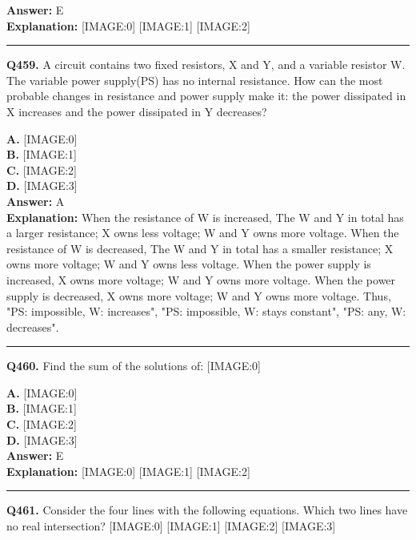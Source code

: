 \documentclass[12pt]{article}
\begin{document}
\textbf{Answer:} E \\
\textbf{Explanation:} [IMAGE:0]
[IMAGE:1]
[IMAGE:2]

\hrule
\vspace{1em}


\noindent
\textbf{Q459.} A circuit contains two fixed resistors, X and Y, and a variable resistor W. The variable power supply(PS) has no internal resistance.
How can the most probable changes in resistance and power supply make it: the power dissipated in X increases and the power dissipated in Y decreases?



\textbf{A.} [IMAGE:0] \\
\textbf{B.} [IMAGE:1] \\
\textbf{C.} [IMAGE:2] \\
\textbf{D.} [IMAGE:3] \\

\textbf{Answer:} A \\
\textbf{Explanation:} When the resistance of W is increased, The W and Y in total has a larger resistance; X owns less voltage; W and Y owns more voltage.
When the resistance of W is decreased, The W and Y in total has a smaller resistance; X owns more voltage; W and Y owns less voltage.
When the power supply is increased, X owns more voltage; W and Y owns more voltage.
When the power supply is decreased, X owns more voltage; W and Y owns more voltage.
Thus, "PS: impossible, W: increases", "PS: impossible, W: stays constant", "PS: any, W: decreases".

\hrule
\vspace{1em}


\noindent
\textbf{Q460.} Find the sum of the solutions of:
[IMAGE:0]



\textbf{A.} [IMAGE:0] \\
\textbf{B.} [IMAGE:1] \\
\textbf{C.} [IMAGE:2] \\
\textbf{D.} [IMAGE:3] \\

\textbf{Answer:} E \\
\textbf{Explanation:} [IMAGE:0]
[IMAGE:1]
[IMAGE:2]

\hrule
\vspace{1em}


\noindent
\textbf{Q461.} Consider the four lines with the following equations.
Which two lines have no real intersection?
[IMAGE:0]
[IMAGE:1]
[IMAGE:2]
[IMAGE:3]
\end{document}
